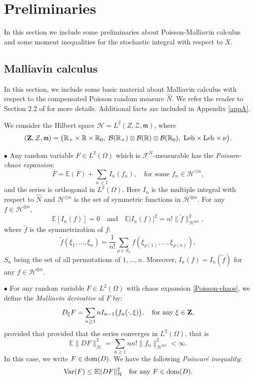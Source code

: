\documentclass[12pt]{article}
\def\cB{\mathcal{B}}
\def\cF{\mathcal{F}}
\def\cH{\mathcal{H}}
\def\cZ{\mathcal{Z}}
\def\bE{\mathbb{E}}
\def\bR{\mathbb{R}}
\newcommand{\fm}{\mathfrak{m}}
\begin{document}
\section{Preliminaries}
\label{section-prelim}


In this section we include some preliminaries about Poisson-Malliavin calculus and some moment inequalities for the stochastic integral with respect to $X$.

\subsection{Malliavin calculus}

In this section, we include some basic material about Malliavin calculus with respect to the compensated Poisson random measure $\widehat{N}$. We refer the reader to Section 2.2 of \cite{BZ25} for more details. Additional facts are included in Appendix \ref{appA}.

\medskip

We consider the Hilbert space $\cH=L^2(Z,\cZ,\fm)$, where
\[
({\bf Z},\cZ,\fm)=\big(\bR_{+} \times \bR \times \bR_0,\ \cB(\bR_+)\otimes \cB(\bR) \otimes \cB(\bR_0), \ {\rm Leb} \times {\rm Leb} \times \nu\big).
\]

\medskip

$\bullet$
Any random variable $F \in L^2(\Omega)$ which is $\cF^N$-measurable has the {\em Poisson-chaos expansion}:
\begin{equation}
\label{Poisson-chaos}
F=\bE(F)+\sum_{n\geq 1}I_n(f_n), \quad \mbox{for some $f_n \in \cH^{\odot n}$},
\end{equation}
and the series is orthogonal in $L^2(\Omega)$. Here $I_n$ is the multiple integral with respect to $\widehat{N}$ and $\cH^{\odot n}$ is the set of symmetric functions in $\cH^{\otimes n}$.
For any $f \in \cH^{\otimes n}$,
\[
\bE[I_n(f)]=0 \quad \mbox{and} \quad \bE|I_n(f)|^2=n! \|\widetilde{f}\|_{\cH^{\otimes n}}^2,
\]
where $\widetilde{f}$ is the symmetrization of $f$:
\[
\widetilde{f}(\xi_1,\ldots,\xi_n)=\frac{1}{n!}\sum_{\rho \in S_n}f(\xi_{\rho(1)},\ldots,\xi_{\rho(n)}),
\]
$S_n$ being the set of all permutations of $1,\ldots,n$.
Moreover, $I_n(f)=I_n(\widetilde{f})$ for any $f \in \cH^{\otimes n}$.

\medskip

$\bullet$
For any random variable $F \in L^2(\Omega)$ with chaos expansion \eqref{Poisson-chaos}, we define the {\em Malliavin derivative} of $F$ by:
\[
D_{\xi}F=\sum_{n\geq 1}nI_{n-1}\big(f_n(\cdot,\xi)\big), \quad \mbox{for any $\xi \in {\bf Z}$},
\]
provided that provided that the series converges in $L^2(\Omega)$, that is 
\begin{equation}
\label{check-D1}
\bE\|DF\|_{\cH}^2=\sum_{n\geq 1}nn!  \|f_n\|_{\cH^{\otimes n}}^2 <\infty.
\end{equation}
 In this case, we write $F \in {\rm dom}(D)$.
We have the following {\em Poincar\'e inequality}:
\begin{equation}
\label{poincare}
{\rm Var}(F) \leq \bE\|DF\|_{\cH}^2 \quad \mbox{for any $F \in {\rm dom}(D)$.}
\end{equation}
\end{document}
